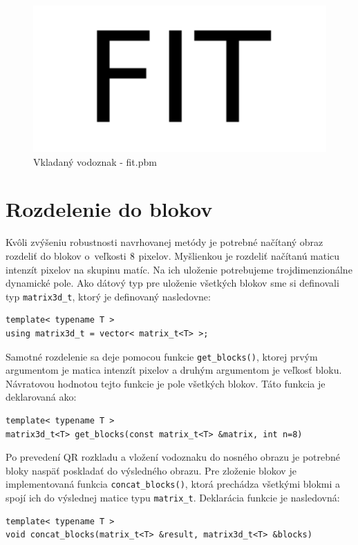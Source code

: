 \begin{figure}
    \centering
    \includegraphics[scale=0.5]{obrazky/fit}
    \caption{Vkladaný vodoznak - fit.pbm}
    \label{fig:watermark}
\end{figure}

\section{Rozdelenie do blokov}
\label{impl:divide}
Kvôli zvýšeniu robustnosti navrhovanej metódy je potrebné načítaný obraz rozdeliť do blokov o~veľkosti $8\time8$ pixelov. Myšlienkou je rozdeliť načítanú maticu intenzít pixelov na skupinu matíc. Na ich uloženie potrebujeme trojdimenzionálne dynamické pole. Ako dátový typ pre uloženie všetkých blokov sme si definovali typ {\tt matrix3d\_t}, ktorý je definovaný nasledovne:
\begin{lstlisting}
template< typename T >
using matrix3d_t = vector< matrix_t<T> >;
\end{lstlisting}

Samotné rozdelenie sa deje pomocou funkcie {\tt get\_blocks()}, ktorej prvým argumentom je matica intenzít pixelov a druhým argumentom je veľkosť bloku. Návratovou hodnotou tejto funkcie je pole všetkých blokov. Táto funkcia je deklarovaná ako:
\begin{lstlisting}
template< typename T >
matrix3d_t<T> get_blocks(const matrix_t<T> &matrix, int n=8)
\end{lstlisting}

Po prevedení QR rozkladu a vložení vodoznaku do nosného obrazu je potrebné bloky naspäť poskladať do výsledného obrazu. Pre zloženie blokov je implementovaná funkcia {\tt concat\_blocks()}, ktorá prechádza všetkými blokmi a spojí ich do výslednej matice typu {\tt matrix\_t}. Deklarácia funkcie je nasledovná:
\begin{lstlisting}
template< typename T >
void concat_blocks(matrix_t<T> &result, matrix3d_t<T> &blocks)
\end{lstlisting}

